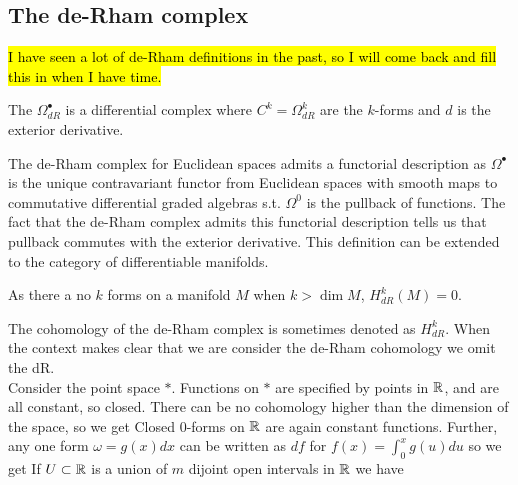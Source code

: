 \documentclass{article}
\begin{document}
\subsection{The de-Rham complex}
\hl{I have seen a lot of de-Rham definitions in the past, so I will come back and fill this in when I have time.}


\begin{definition}
	The  $\Omega^\bullet_{dR}$ is a differential complex where $C^k = \Omega^k_{dR}$ are the $k$-forms and $d$ is the exterior derivative. 
\end{definition}


\begin{remark}
		The de-Rham complex for Euclidean spaces admits a functorial description as $\Omega^\bullet$ is the unique contravariant functor from Euclidean spaces with smooth maps to commutative differential graded algebras s.t. $\Omega^0$ is the pullback of functions. The fact that the de-Rham complex admits this functorial description tells us that pullback commutes with the exterior derivative. This definition can be extended to the category of differentiable manifolds. 
\end{remark}

\begin{remark}
	As there a no $k$ forms on a manifold $M$ when $k > \dim M$, $H^k_{dR}(M)=0$.
\end{remark}

\begin{example}
	The cohomology of the de-Rham complex is sometimes denoted as $H^k_{dR}$. When the context makes clear that we are consider the de-Rham cohomology we omit the dR. \\
	Consider the point space $\ast$. Functions on $\ast$ are specified by points in $\mathbb{R}$, and are all constant, so closed. There can be no cohomology higher than the dimension of the space, so we get 
	Closed $0$-forms on $\mathbb{R}$ are again constant functions. Further, any one form $\omega = g(x)dx$ can be written as $df$ for $f(x) = \int_0^x g(u) du$ so we get 
	If $U\subset \mathbb{R}$ is a union of $m$ dijoint open intervals in $\mathbb{R}$ we have 
\end{example}
\end{document}
